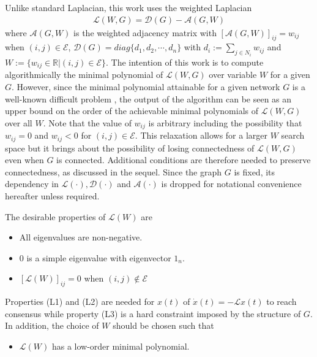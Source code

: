 \documentclass[onecolumn,reviewcopy]{autart}
\def \L{\mathcal{L}}
\def \E{\mathcal{E}}
\def \D{\mathcal{D}}
\def \A{\mathcal{A}}
\begin{document}
Unlike standard Laplacian, this work uses the weighted Laplacian
\begin{align}
\L(W,G)= \D(G)- \A(G,W)
\end{align}
where $\A(G,W)$ is the weighted adjacency matrix with $[\A(G,W)]_{ij}=w_{ij}$ when $(i,j) \in \E$,
$\D(G)=diag\{d_1,d_2,\cdots, d_n\}$ with $d_i:=\sum_{j\in N_i} w_{ij}$ and $W:=\{w_{ij} \in \mathbb{R} | (i,j) \in \E\}$.
The intention of this work is to compute algorithmically the minimal polynomial of $\L(W,G)$ over variable $W$ for a given $G$.
However, since the minimal polynomial attainable for a given network $G$ is a well-known difficult problem \citep{ART:FH07},
the output of the algorithm can be seen as an upper bound on the order of the achievable minimal polynomials of $\L(W,G)$ over all $W$.
Note that the value of $w_{ij}$ is arbitrary including the possibility that $w_{ij}=0$ and $w_{ij}<0$ for $(i,j) \in \E$.
This relaxation allows for a larger $W$ search space but it brings about the possibility of losing connectedness of $\L(W,G)$ even when $G$ is connected. Additional conditions are therefore needed to preserve connectedness, as discussed in the sequel. Since the graph $G$ is fixed, its dependency in $\L(\cdot), \D(\cdot)$ and $\A(\cdot)$ is dropped for notational convenience hereafter unless required.

The desirable properties of $\L(W)$ are
\begin{itemize}
  \item[(L1)] All eigenvalues are non-negative.
  \item[(L2)] 0 is a simple eigenvalue with eigenvector $1_n$.
  \item[(L3)] $[\L(W)]_{ij}=0$ when $(i,j) \notin \E$
\end{itemize}
Properties (L1) and (L2) are needed for $x(t)$ of $\dot x(t)=-\L x(t)$ to reach consensus while property (L3) is a hard constraint imposed by the structure of $G$. In addition, the choice of $W$ should be chosen such that
\begin{itemize}
  \item[(L4)] $\L(W)$ has a low-order minimal polynomial.
\end{itemize}
\end{document}
